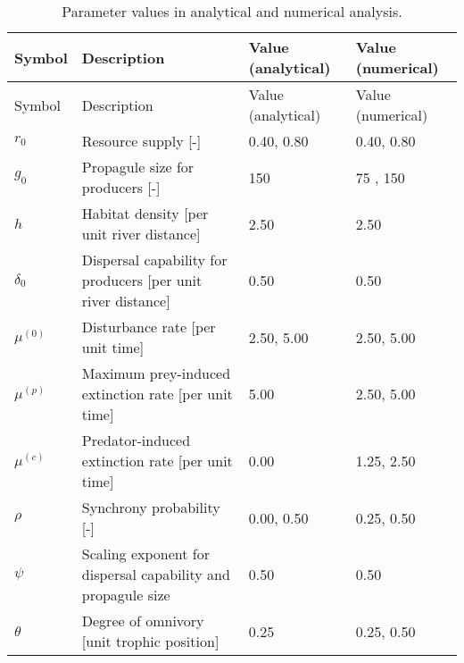 \begin{longtable}[]{@{}llll@{}}
\caption{Parameter values in analytical and numerical
analysis.}\tabularnewline
\toprule\noalign{}
Symbol & Description & Value (analytical) & Value (numerical) \\
\midrule\noalign{}
\endfirsthead
\toprule\noalign{}
Symbol & Description & Value (analytical) & Value (numerical) \\
\midrule\noalign{}
\endhead
\bottomrule\noalign{}
\endlastfoot
\(r_0\) & Resource supply {[}-{]} & 0.40, 0.80 & 0.40, 0.80 \\
\(g_0\) & Propagule size for producers {[}-{]} & 150 & 75 , 150 \\
\(h\) & Habitat density {[}per unit river distance{]} & 2.50 & 2.50 \\
\(\delta_0\) & Dispersal capability for producers {[}per unit river
distance{]} & 0.50 & 0.50 \\
\(\mu^{(0)}\) & Disturbance rate {[}per unit time{]} & 2.50, 5.00 &
2.50, 5.00 \\
\(\mu^{(p)}\) & Maximum prey-induced extinction rate {[}per unit time{]}
& 5.00 & 2.50, 5.00 \\
\(\mu^{(c)}\) & Predator-induced extinction rate {[}per unit time{]} &
0.00 & 1.25, 2.50 \\
\(\rho\) & Synchrony probability {[}-{]} & 0.00, 0.50 & 0.25, 0.50 \\
\(\psi\) & Scaling exponent for dispersal capability and propagule size
& 0.50 & 0.50 \\
\(\theta\) & Degree of omnivory {[}unit trophic position{]} & 0.25 &
0.25, 0.50 \\
\end{longtable}
